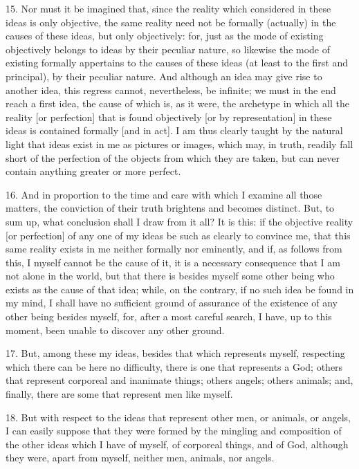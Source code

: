 15. Nor must it be imagined that, since the reality which considered in these ideas is only objective, the same reality need not be formally (actually) in the causes of these ideas, but only objectively: for, just as the mode of existing objectively belongs to ideas by their peculiar nature, so likewise the mode of existing formally appertains to the causes of these ideas (at least to the first and principal), by their peculiar nature. And although an idea may give rise to another idea, this regress cannot, nevertheless, be infinite; we must in the end reach a first idea, the cause of which is, as it were, the archetype in which all the reality [or perfection] that is found objectively [or by representation] in these ideas is contained formally [and in act]. I am thus clearly taught by the natural light that ideas exist in me as pictures or images, which may, in truth, readily fall short of the perfection of the objects from which they are taken, but can never contain anything greater or more perfect.

16. And in proportion to the time and care with which I examine all those matters, the conviction of their truth brightens and becomes distinct. But, to sum up, what conclusion shall I draw from it all? It is this: if the objective reality [or perfection] of any one of my ideas be such as clearly to convince me, that this same reality exists in me neither formally nor eminently, and if, as follows from this, I myself cannot be the cause of it, it is a necessary consequence that I am not alone in the world, but that there is besides myself some other being who exists as the cause of that idea; while, on the contrary, if no such idea be found in my mind, I shall have no sufficient ground of assurance of the existence of any other being besides myself, for, after a most careful search, I have, up to this moment, been unable to discover any other ground.

17. But, among these my ideas, besides that which represents myself, respecting which there can be here no difficulty, there is one that represents a God; others that represent corporeal and inanimate things; others angels; others animals; and, finally, there are some that represent men like myself.

18. But with respect to the ideas that represent other men, or animals, or angels, I can easily suppose that they were formed by the mingling and composition of the other ideas which I have of myself, of corporeal things, and of God, although they were, apart from myself, neither men, animals, nor angels.

